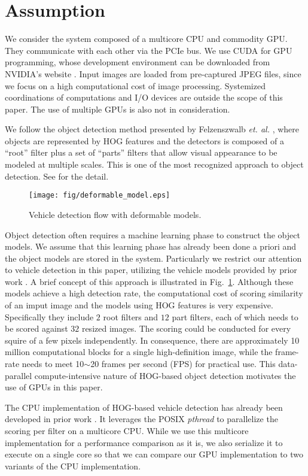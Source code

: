 \section{Assumption}
\label{sec:assumption}

We consider the system composed of a multicore CPU and commodity GPU.
They communicate with each other via the PCIe bus.
We use CUDA \cite{NVIDIA_CUDA} for GPU programming, whose development
environment can be downloaded from NVIDIA's website \cite{NVIDIA_NVCC}.
Input images are loaded from pre-captured JPEG files, since we focus on
a high computational cost of image processing.
Systemized coordinations of computations and I/O devices are outside the
scope of this paper.
The use of multiple GPUs is also not in consideration.

We follow the object detection method presented by Felzenszwalb
\textit{et. al.} \cite{Felzenszwalb10}, where objects are represented by
HOG features \cite{Dalal05} and the detectors is composed of a ``root''
filter plus a set of ``parts'' filters that allow visual appearance to
be modeled at multiple scales.
This is one of the most recognized approach to object detection.
See \cite{Felzenszwalb10} for the detail.

\begin{figure}[t]
 \begin{center}
  \texttt{[image: fig/deformable\_model.eps]}\\
  \caption{Vehicle detection flow with deformable models.}
  \label{fig:deformable_model}
 \end{center}
\end{figure}

Object detection often requires a machine learning phase to construct
the object models.
We assume that this learning phase has already been done a priori and
the object models are stored in the system.
Particularly we restrict our attention to vehicle detection in this
paper, utilizing the vehicle models provided by prior work
\cite{Niknejad12}.
A brief concept of this approach is illustrated in
Fig.~\ref{fig:deformable_model}.
Although these models achieve a high detection rate, the computational
cost of scoring similarity of an imput image and the models using HOG
features is very expensive.
Specifically they include $2$ root filters and $12$ part filters, each
of which needs to be scored against $32$ resized images.
The scoring could be conducted for every squire of a few pixels
independently.
In consequence, there are approximately 10 million computational
blocks for a single high-definition image, while the frame-rate needs to
meet 10$\sim$20 frames per second (FPS) for practical use.
This data-parallel compute-intensive nature of HOG-based object
detection motivates the use of GPUs in this paper.

The CPU implementation of HOG-based vehicle detection has already been
developed in prior work \cite{Niknejad12}.
It leverages the POSIX \textit{pthread} to parallelize the scoring per
filter on a multicore CPU.
While we use this multicore implementation for a performance comparison
as it is, we also serialize it to execute on a single core so that we
can compare our GPU implementation to two variants of the CPU
implementation.
